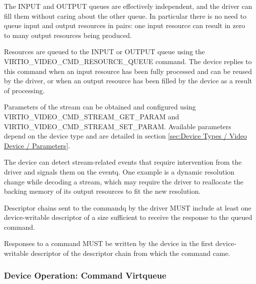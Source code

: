 The INPUT and OUTPUT queues are effectively independent, and the driver
can fill them without caring about the other queue. In particular there
is no need to queue input and output resources in pairs: one input
resource can result in zero to many output resources being produced.

Resources are queued to the INPUT or OUTPUT queue using the
VIRTIO_VIDEO_CMD_RESOURCE_QUEUE command. The device replies to this
command when an input resource has been fully processed and can be
reused by the driver, or when an output resource has been filled by the
device as a result of processing.

Parameters of the stream can be obtained and configured using
VIRTIO_VIDEO_CMD_STREAM_GET_PARAM and
VIRTIO_VIDEO_CMD_STREAM_SET_PARAM. Available parameters depend on
the device type and are detailed in section
\ref{sec:Device Types / Video Device / Parameters}.

The device can detect stream-related events that require intervention
from the driver and signals them on the eventq. One example is a dynamic
resolution change while decoding a stream, which may require the driver
to reallocate the backing memory of its output resources to fit the new
resolution.


Descriptor chains sent to the commandq by the driver MUST include at
least one device-writable descriptor of a size sufficient to receive the
response to the queued command.


Responses to a command MUST be written by the device in the first
device-writable descriptor of the descriptor chain from which the
command came.

\subsubsection{Device Operation: Command Virtqueue}\label{sec:Device Types / Video Device / Device Operation / Device Operation: Command Virtqueue}

